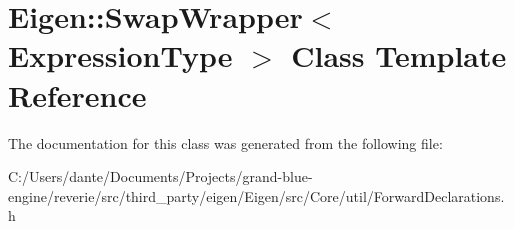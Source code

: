 \hypertarget{class_eigen_1_1_swap_wrapper}{}\section{Eigen\+::Swap\+Wrapper$<$ Expression\+Type $>$ Class Template Reference}
\label{class_eigen_1_1_swap_wrapper}


The documentation for this class was generated from the following file\+:\begin{DoxyCompactItemize}
\item 
C\+:/\+Users/dante/\+Documents/\+Projects/grand-\/blue-\/engine/reverie/src/third\+\_\+party/eigen/\+Eigen/src/\+Core/util/Forward\+Declarations.\+h\end{DoxyCompactItemize}
